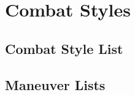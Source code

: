 \chapter{Combat Styles}\label{Combat Styles}

\section{Combat Style List}\label{Combat Style List}

  

  \newpage
\section{Maneuver Lists}\label{Maneuver Lists}

  

  
